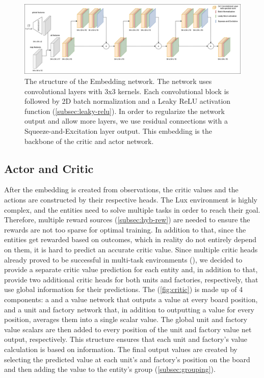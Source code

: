 \begin{figure}[htbp]
    \centering
    \includegraphics[width=1\linewidth]{images/methods_hybrid/feature_extractor/embedding.png}
    \captionsetup{justification=justified, singlelinecheck=false, width=1\linewidth, labelfont=bf} 
    \caption[]{The structure of the Embedding network. The network uses convolutional layers with 3x3 kernels. Each convolutional block is followed by 2D batch normalization and a Leaky ReLU activation function (\autoref{subsec:leaky-relu}). In order to regularize the network output and allow more layers, we use residual connections with a Squeeze-and-Excitation layer output. This embedding is the backbone of the critic and actor network.}
    \label{fig:embedding}
\end{figure}

\subsection{Actor and Critic}
\label{sec:hybrid-network-actor-critic}

\noindent After the embedding is created from observations, the critic values and the actions are constructed by their respective heads. The Lux environment is highly complex, and the entities need to solve multiple tasks in order to reach their goal. Therefore, multiple reward sources (\autoref{subsec:hyb-rew}) are needed to ensure the rewards are not too sparse for optimal training. In addition to that, since the entities get rewarded based on outcomes, which in reality do not entirely depend on them, it is hard to predict an accurate critic value. Since multiple critic heads already proved to be successful in multi-task environments (\cite{mysore2022multicritic}), we decided to provide a separate critic value prediction for each entity and, in addition to that, provide two additional critic heads for both units and factories, respectively, that use global information for their predictions. The  (\autoref{fig:critic}) is made up of 4 components: a  and a  value network that outputs a value at every board position, and a unit and factory  network that, in addition to outputting a value for every position, averages them into a single scalar value. The global unit and factory value scalars are then added to every position of the unit and factory value net output, respectively. This structure ensures that each unit and factory's value calculation is based on  information. The final output values are created by selecting the predicted value at each unit's and factory's position on the board and then adding the value to the entity's group (\autoref{subsec:grouping}).

